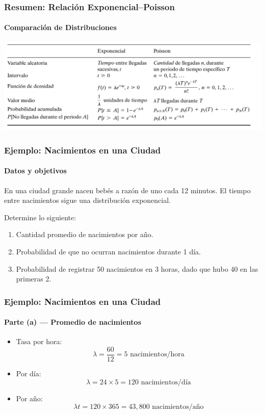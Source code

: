 \documentclass{beamer}
\begin{document}
\begin{frame}
\frametitle{Resumen: Relación Exponencial–Poisson}
\framesubtitle{Comparación de Distribuciones}

\begin{center}
\includegraphics[scale=0.5]{images/tabla.png}
\end{center}
\end{frame}

\begin{frame}
\frametitle{Ejemplo: Nacimientos en una Ciudad}
\framesubtitle{Datos y objetivos}

En una ciudad grande nacen bebés a razón de uno cada 12 minutos. El tiempo entre nacimientos sigue una distribución exponencial.

\vspace{0.2cm}
Determine lo siguiente:

\begin{enumerate}
    \item Cantidad promedio de nacimientos por año.
    \item Probabilidad de que no ocurran nacimientos durante 1 día.
    \item Probabilidad de registrar 50 nacimientos en 3 horas, dado que hubo 40 en las primeras 2.
\end{enumerate}
\end{frame}

\begin{frame}
\frametitle{Ejemplo: Nacimientos en una Ciudad}
\framesubtitle{Parte (a) — Promedio de nacimientos}

\begin{itemize}
    \item Tasa por hora:
    \[
    \lambda = \frac{60}{12} = 5 \text{ nacimientos/hora}
    \]
    \item Por día:
    \[
    \lambda = 24 \times 5 = 120 \text{ nacimientos/día}
    \]
    \item Por año:
    \[
    \lambda t = 120 \times 365 = 43{,}800 \text{ nacimientos/año}
    \]
\end{itemize}
\end{frame}
\end{document}
